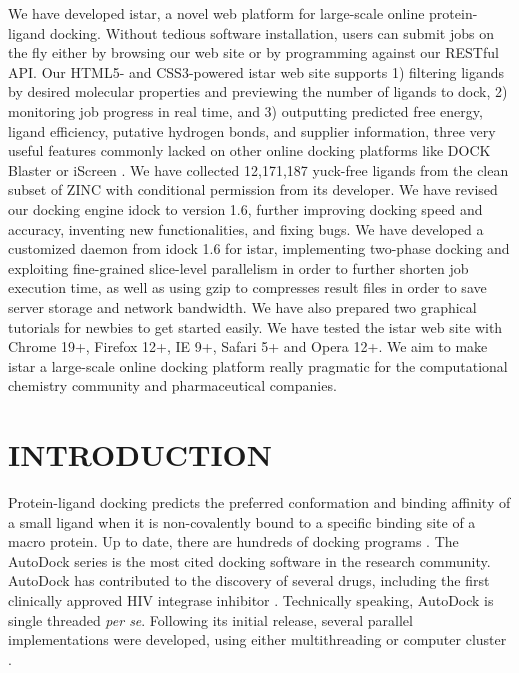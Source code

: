 \documentclass[12pt]{article}
\begin{document}
We have developed istar, a novel web platform for large-scale online protein-ligand docking. Without tedious software installation, users can submit jobs on the fly either by browsing our web site or by programming against our RESTful API. Our HTML5- and CSS3-powered istar web site supports 1) filtering ligands by desired molecular properties and previewing the number of ligands to dock, 2) monitoring job progress in real time, and 3) outputting predicted free energy, ligand efficiency, putative hydrogen bonds, and supplier information, three very useful features commonly lacked on other online docking platforms like DOCK Blaster \citep{557} or iScreen \citep{899}. We have collected 12,171,187 yuck-free ligands from the clean subset of ZINC \citep{532,1178} with conditional permission from its developer. We have revised our docking engine idock \citep{1153} to version 1.6, further improving docking speed and accuracy, inventing new functionalities, and fixing bugs. We have developed a customized daemon from idock 1.6 for istar, implementing two-phase docking and exploiting fine-grained slice-level parallelism in order to further shorten job execution time, as well as using gzip to compresses result files in order to save server storage and network bandwidth. We have also prepared two graphical tutorials for newbies to get started easily. We have tested the istar web site with Chrome 19+, Firefox 12+, IE 9+, Safari 5+ and Opera 12+. We aim to make istar a large-scale online docking platform really pragmatic for the computational chemistry community and pharmaceutical companies.

\section*{\sffamily \Large INTRODUCTION} %

Protein-ligand docking predicts the preferred conformation and binding affinity of a small ligand when it is non-covalently bound to a specific binding site of a macro protein. Up to date, there are hundreds of docking programs \citep{493,922}. The AutoDock series is the most cited docking software in the research community. AutoDock has contributed to the discovery of several drugs, including the first clinically approved HIV integrase inhibitor \citep{1169}. Technically speaking, AutoDock is single threaded \textit{per se}. Following its initial release, several parallel implementations were developed, using either multithreading or computer cluster \citep{115,560,782}.
\end{document}
